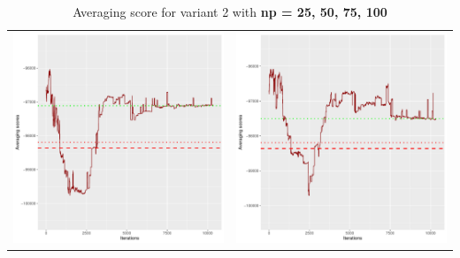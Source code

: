 \documentclass[]{scrartcl}
\begin{document}
\begin{table}[h!]
\begin{tabular}{cc}
\includegraphics[scale = 0.4]{./figs/hepar2/v2/75/avgBoundsEvolution-10352.pdf} & 
\includegraphics[scale = 0.4]{./figs/hepar2/v2/100/avgBoundsEvolution-10352.pdf} \\
\end{tabular}
\caption{Averaging score for variant 2 with \textbf{np =  25, 50, 75, 100}}
\end{table}
\end{document}
